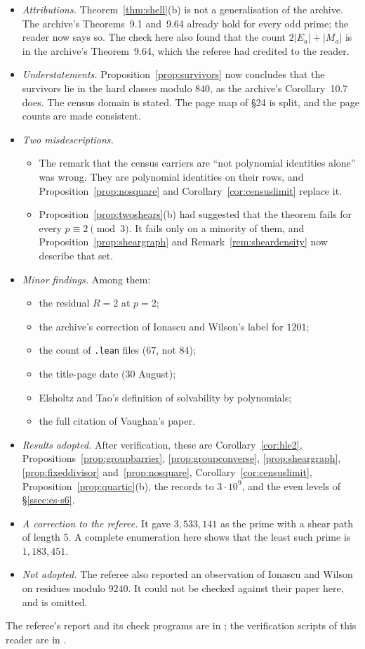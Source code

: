 \begin{itemize}
\item \emph{Attributions.} Theorem~\ref{thm:shell}(b) is not a generalisation of the archive. The archive's Theorems~9.1 and~9.64 already hold for every odd prime; the reader now says so. The check here also found that the count $2|E_a|+|M_a|$ is in the archive's Theorem~9.64, which the referee had credited to the reader.
\item \emph{Understatements.} Proposition~\ref{prop:survivors} now concludes that the survivors lie in the hard classes modulo $840$, as the archive's Corollary~10.7 does. The census domain is stated. The page map of §24 is split, and the page counts are made consistent.
\item \emph{Two misdescriptions.}
\begin{itemize}
\item The remark that the census carriers are ``not polynomial identities alone'' was wrong. They are polynomial identities on their rows, and Proposition~\ref{prop:nosquare} and Corollary~\ref{cor:censuslimit} replace it.
\item Proposition~\ref{prop:twoshears}(b) had suggested that the theorem fails for every $p\equiv2\pmod3$. It fails only on a minority of them, and Proposition~\ref{prop:sheargraph} and Remark~\ref{rem:sheardensity} now describe that set.
\end{itemize}
\item \emph{Minor findings.} Among them:
\begin{itemize}
\item the residual $R=2$ at $p=2$;
\item the archive's correction of Ionascu and Wilson's label for $1201$;
\item the count of \texttt{.lean} files ($67$, not $84$);
\item the title-page date ($30$ August);
\item Elsholtz and Tao's definition of solvability by polynomials;
\item the full citation of Vaughan's paper.
\end{itemize}
\item \emph{Results adopted.} After verification, these are Corollary~\ref{cor:hle2}, Propositions~\ref{prop:groupbarrier}, \ref{prop:groupconverse}, \ref{prop:sheargraph}, \ref{prop:fixeddivisor} and~\ref{prop:nosquare}, Corollary~\ref{cor:censuslimit}, Proposition~\ref{prop:quartic}(b), the records to $3\cdot10^9$, and the even levels of §\ref{ssec:es-s6}.
\item \emph{A correction to the referee.} It gave $3{,}533{,}141$ as the prime with a shear path of length $5$. A complete enumeration here shows that the least such prime is $1{,}183{,}451$.
\item \emph{Not adopted.} The referee also reported an observation of Ionascu and Wilson on residues modulo $9240$. It could not be checked against their paper here, and is omitted.
\end{itemize}
The referee's report and its check programs are in ; the verification scripts of this reader are in .

